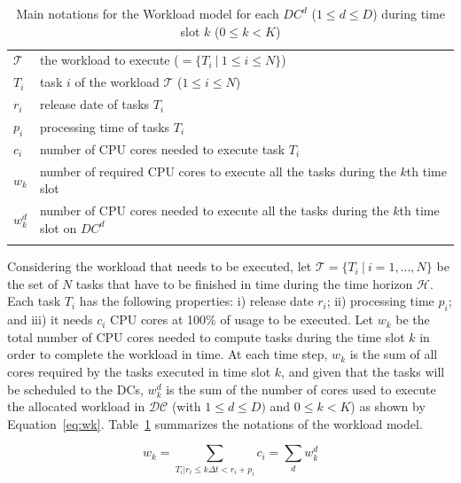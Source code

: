 \begin{table}[!t]
\caption{Main notations for the Workload model for each $DC^d$ ($1\leq d\leq D$) during time slot $k$ ($0\leq k< K$)}
\label{tab:notations_workload_model}
\begin{center}
\begin{tabular}{l p{11cm}}
$\mathcal{T}$ & the workload to execute ($ = \{ T_i\ |\ 1\leq i\leq N\}$) \\
$T_i$ & task $i$ of the workload $\mathcal{T}$ ($1\leq i\leq N$) \\
$r_i$ & release date of tasks $T_i$\\
$p_i$ & processing time of tasks $T_i$\\
$c_i$ & number of CPU cores needed to execute task $T_i$\\ 
$w_k$ & number of required CPU cores to execute all the tasks during the $k$th time slot \\
$w_k^d$ & number of CPU cores needed to execute all the tasks during the $k$th time slot on $DC^d$\\ 
\\\end{tabular}
\end{center}
\end{table}



Considering the workload that needs to be executed, let $\mathcal{T} = \{T_i \ | \ i=1, \ldots, N\}$ be the set of $N$ tasks that have to be finished in time during the time horizon $\mathcal{H}$. Each task $T_i$ has the following properties: i) release date $r_i$; ii)  processing time $p_i$;  and iii) it needs $c_i$ CPU cores at 100\% of usage to be executed. Let $w_k$ be the total number of CPU cores needed to compute tasks during the time slot $k$ in order to complete the workload in time. At each time step, $w_k$ is the sum of all cores required by the tasks executed in time slot $k$, and given that the tasks will be scheduled to the DCs,  $w_k^d$ is the sum of the number of cores used to execute the allocated workload in $\mathcal{DC}$ (with $1\leq d\leq D)$ and $0\leq k<K$) as shown by Equation~\eqref{eq:wk}. Table~\ref{tab:notations_workload_model} summarizes the notations of the workload model.

\begin{equation} \label{eq:wk}
    w_k = \sum_{T_i|r_i\leq k\Delta t<r_i+p_i} c_i = \sum_d w_k^d
\end{equation}


